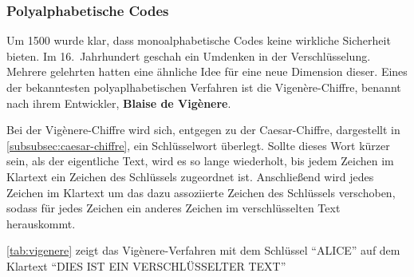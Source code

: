 \subsubsection{Polyalphabetische Codes}\label{subsubsec:polyalphabetische-codes}
Um 1500 wurde klar, dass \gls{monoalphabetisch}e Codes keine wirkliche Sicherheit bieten.
Im 16.\ Jahrhundert geschah ein Umdenken in der Verschlüsselung.
Mehrere gelehrten hatten eine ähnliche Idee für eine neue Dimension dieser.\autocite[]{beutelspacher_kurze_2017}
Eines der bekanntesten polyaplhabetischen Verfahren ist die Vigenère-Chiffre, benannt nach ihrem Entwickler, \textbf{Blaise de Vigènere}.

Bei der Vigènere-Chiffre wird sich, entgegen zu der Caesar-Chiffre, dargestellt in \autoref{subsubsec:caesar-chiffre}, ein Schlüsselwort überlegt.
Sollte dieses Wort kürzer sein, als der eigentliche Text, wird es so lange wiederholt, bis jedem Zeichen im Klartext ein Zeichen des Schlüssels zugeordnet ist.
Anschließend wird jedes Zeichen im Klartext um das dazu assoziierte Zeichen des Schlüssels verschoben, sodass für jedes Zeichen ein anderes Zeichen im verschlüsselten Text herauskommt.

\autoref{tab:vigenere}\autocite[]{Kryptografische_algorithmen} zeigt das Vigènere-Verfahren mit dem Schlüssel \enquote{ALICE} auf dem Klartext \enquote{DIES IST EIN VERSCHLÜSSELTER TEXT}

\begin{table}[htbp]
    \caption[
        Verschlüsselung mit Vigènere-Verfahren]{Verschlüsselung mit Vigènere-Verfahren\footnotemark}
    \label{tab:vigenere}
\end{table}

